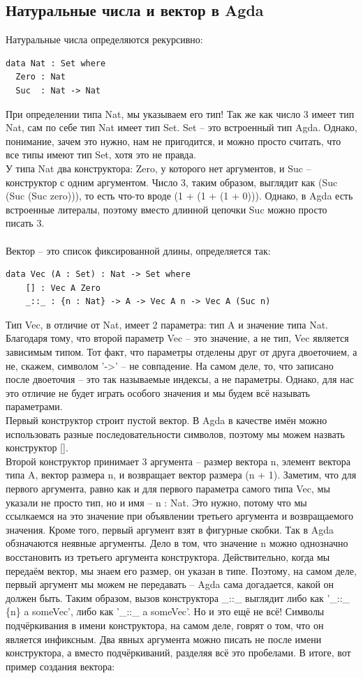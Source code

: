 \documentclass[8pt]{extarticle}
\begin{document}
\subsection{Натуральные числа и вектор в Agda}

Натуральные числа определяются рекурсивно:
\begin{lstlisting}
data Nat : Set where
  Zero : Nat
  Suc  : Nat -> Nat
\end{lstlisting}
При определении типа Nat, мы указываем его тип! Так же как число 3 имеет тип Nat, сам по себе тип Nat имеет тип Set. Set -- это встроенный тип Agda. Однако, понимание, зачем это нужно, нам не пригодится, и можно просто считать, что все типы имеют тип Set, хотя это не правда.\\
У типа Nat два конструктора: Zero, у которого нет аргументов, и Suc -- конструктор с одним аргументом. Число 3, таким образом, выглядит как (Suc (Suc (Suc zero))), то есть что-то вроде (1 + (1 + (1 + 0))). Однако, в Agda есть встроенные литералы, поэтому вместо длинной цепочки Suc можно просто писать 3.\\
\\
Вектор -- это список фиксированной длины, определяется так:
\begin{lstlisting}
data Vec (A : Set) : Nat -> Set where
	[] : Vec A Zero
	_::_ : {n : Nat} -> A -> Vec A n -> Vec A (Suc n)
\end{lstlisting}
Тип Vec, в отличие от Nat, имеет 2 параметра: тип A и значение типа Nat. Благодаря тому, что второй параметр Vec -- это значение, а не тип, Vec является зависимым типом. Тот факт, что параметры отделены друг от друга двоеточием, а не, скажем, символом '->' -- не совпадение. На самом деле, то, что записано после двоеточия -- это так называемые индексы, а не параметры. Однако, для нас это отличие не будет играть особого значения и мы будем всё называть параметрами.\\
Первый конструктор строит пустой вектор. В Agda в качестве имён можно использовать разные последовательности символов, поэтому мы можем назвать конструктор [].\\
Второй конструктор принимает 3 аргумента -- размер вектора n, элемент вектора типа A, вектор размера n, и возвращает вектор размера (n + 1). Заметим, что для первого аргумента, равно как и для первого параметра самого типа Vec, мы указали не просто тип, но и имя -- n : Nat. Это нужно, потому что мы ссылкаемся на это значение при объявлении третьего аргумента и возвращаемого значения. Кроме того, первый аргумент взят в фигурные скобки. Так в Agda обзначаются неявные аргументы. Дело в том, что значение n можно однозначно восстановить из третьего аргумента конструктора. Действительно, когда мы передаём вектор, мы знаем его размер, он указан в типе. Поэтому, на самом деле, первый аргумент мы можем не передавать -- Agda сама догадается, какой он должен быть. Таким образом, вызов конструктора \_::\_ выглядит либо как '\_::\_ \{n\} a someVec', либо как '\_::\_ a someVec'. Но и это ещё не всё! Символы подчёркивания в имени конструктора, на самом деле, говрят о том, что он является инфиксным. Два явных аргумента можно писать не после имени конструктора, а вместо подчёркиваний, разделяя всё это пробелами. В итоге, вот пример создания вектора:
\end{document}
